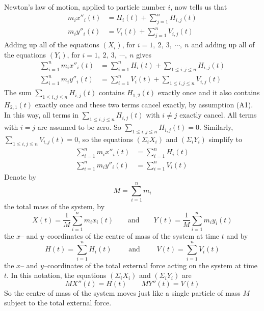 \noindent
Newton's law of motion, applied to particle number $i$,  now tells us that
\begin{align}
m_i x''_i(t)&= H_i(t)+\sum_{j=1}^n H_{i,j}(t)\tag{$X_i$}\\
m_i y''_i(t)&= V_i(t)+\sum_{j=1}^n V_{i,j}(t)\tag{$Y_i$}
\end{align}
Adding up all of the equations $(X_i)$, for
$i=1,\ 2,\ 3,\ \cdots,\ n$
and adding up all of the equations $(Y_i)$,
for $i=1,\ 2,\ 3,\ \cdots,\ n$ gives
\begin{align}
\sum_{i=1}^n m_i x''_i(t)&= \sum_{i=1}^n H_i(t)+\sum_{1\le i,j\le n} H_{i,j}(t)
      \tag{$\Sigma_iX_i$}\\
\sum_{i=1}^n m_i y''_i(t)&= \sum_{i=1}^n V_i(t)+\sum_{1\le i,j\le n} V_{i,j}(t)
      \tag{$\Sigma_iY_i$}
\end{align}
The sum $\sum_{1\le i,j\le n} H_{i,j}(t)$ contains $H_{1,2}(t)$
exactly once and it also contains $H_{2,1}(t)$ exactly once and these two
terms cancel exactly, by assumption (A1). In this way, all terms in
$\sum_{1\le i,j\le n} H_{i,j}(t)$
with $i\ne j$ exactly cancel. All terms with $i=j$ are assumed to be zero.
So $\sum_{1\le i,j\le n} H_{i,j}(t)=0$. Similarly,
$\sum_{1\le i,j\le n} V_{i,j}(t)=0$, so the equations $(\Sigma_iX_i)$
and $(\Sigma_iY_i)$ simplify to
\begin{align}
\sum_{i=1}^n m_i x''_i(t)&= \sum_{i=1}^n H_i(t)
              \tag{$\Sigma_iX_i$}\\
\sum_{i=1}^n m_i y''_i(t)&= \sum_{i=1}^n V_i(t)
     \tag{$\Sigma_iY_i$}
\end{align}
Denote by
\begin{equation*}
M=\sum\limits_{i=1}^n m_i
\end{equation*}
the total mass of the system, by \begin{equation*}
X(t)=\frac{1}{M}\sum\limits_{i=1}^n m_ix_i(t)\qquad \text{and}\qquad
Y(t)=\frac{1}{M}\sum\limits_{i=1}^n m_iy_i(t)
\end{equation*}
the $x$-- and $y$--coordinates of the centre of mass of the system
at time $t$ and by
\begin{equation*}
H(t)=\sum\limits_{i=1}^n H_i(t) \qquad\text{ and }\qquad
V(t)=\sum\limits_{i=1}^n V_i(t)
\end{equation*}
the $x$-- and $y$--coordinates of the total external force acting
on the system at time $t$. In this notation, the equations
$(\Sigma_iX_i)$ and $(\Sigma_iY_i)$ are
\begin{equation}\label{eq:TRQcofmeqn}
MX''(t)=H(t)\qquad MY''(t)=V(t)
\end{equation}
So the centre of mass of the system moves just like a single particle of
mass $M$ subject to the total external force.

